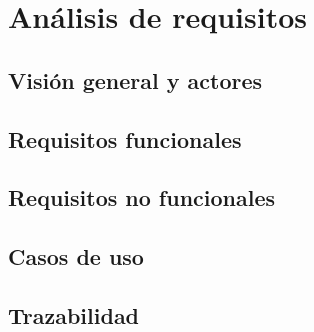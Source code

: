 
\chapter{Análisis de requisitos}
\label{cha:requisitos}

\section{Visión general y actores}
\label{sec:req-vision}


\section{Requisitos funcionales}
\label{sec:req-rf}


\section{Requisitos no funcionales}
\label{sec:req-rnf}


\section{Casos de uso}
\label{sec:req-cu}


\section{Trazabilidad}
\label{sec:req-trazabilidad}










